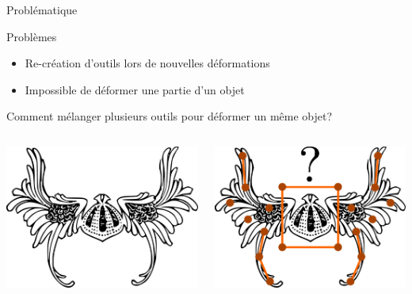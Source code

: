 \documentclass[xcolor=x11names,compress]{beamer}
\renewcommand{\(}{\begin{columns}} \renewcommand{\)}{\end{columns}}
\newcommand{\<}[1]{\begin{column}{#1}} \renewcommand{\>}{\end{column}}
\begin{document}
\begin{frame}{Problématique}
  \begin{alertblock}{Problèmes}
    \begin{itemize}
      \item Re-création d'outils lors de nouvelles déformations
      \item Impossible de déformer une partie d'un objet
    \end{itemize}
  \end{alertblock}
  Comment mélanger plusieurs outils pour déformer un même objet? 
  \vspace{0.1in}
  \begin{columns}[t]
    \begin{column}{0.5\textwidth}
    \centering
      \includegraphics[scale=0.15]{Outil-Mono-Sans}
    \end{column}
    \begin{column}{0.5\textwidth}
    \centering
      \includegraphics[scale=0.15]{Outil-Multi}
    \end{column}
  \end{columns} 
\end{frame}
\end{document}
